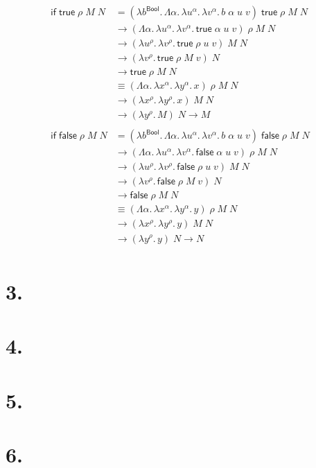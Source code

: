 \documentclass[a4paper, 12pt]{article}
\newcommand{\+}{\enspace}
\newcommand{\If}{\mathsf{if}}
\newcommand{\True}{\mathsf{true}}
\newcommand{\False}{\mathsf{false}}
\newcommand{\Bool}{\mathsf{Bool}}
\begin{document}
\begin{align*}
	\If\;\True\;ρ\;M\;N
		&= (λb^\Bool.\,Λα.\,λu^α.\,λv^α.\,b\;α\;u\;v)\;\True\;ρ\;M\;N \\
		&\rightarrow (Λα.\,λu^α.\,λv^α.\,\True\;α\;u\;v)\;ρ\;M\;N \\
		&\rightarrow (λu^ρ.\,λv^ρ.\,\True\;ρ\;u\;v)\;M\;N \\
		&\rightarrow (λv^ρ.\,\True\;ρ\;M\;v)\;N \\
		&\rightarrow \True\;ρ\;M\;N \\
		&≡ (Λα.\,λx^α.\,λy^α.\,x)\;ρ\;M\;N \\
		&\rightarrow (λx^ρ.\,λy^ρ.\,x)\;M\;N \\
		&\rightarrow (λy^ρ.\,M)\;N \rightarrow M \\ %
	\\
	\If\;\False\;ρ\;M\;N
		&= (λb^\Bool.\,Λα.\,λu^α.\,λv^α.\,b\;α\;u\;v)\;\False\;ρ\;M\;N \\
		&\rightarrow (Λα.\,λu^α.\,λv^α.\,\False\;α\;u\;v)\;ρ\;M\;N \\
		&\rightarrow (λu^ρ.\,λv^ρ.\,\False\;ρ\;u\;v)\;M\;N \\
		&\rightarrow (λv^ρ.\,\False\;ρ\;M\;v)\;N \\
		&\rightarrow \False\;ρ\;M\;N \\
		&≡ (Λα.\,λx^α.\,λy^α.\,y)\;ρ\;M\;N \\
		&\rightarrow (λx^ρ.\,λy^ρ.\,y)\;M\;N \\
		&\rightarrow (λy^ρ.\,y)\;N \rightarrow N \\ %
\end{align*}

\section*{3.}



\section*{4.}

\section*{5.}

\section*{6.}

\begin{prooftree}
\end{prooftree}
\end{document}
